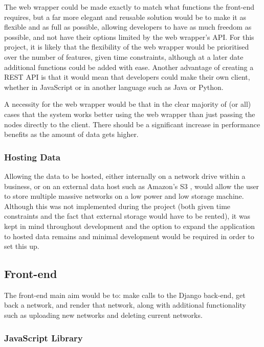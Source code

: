 \documentclass[../dissertation.tex]{subfiles}
\begin{document}
The web wrapper could be made exactly to match what functions the front-end requires, but a far more elegant and reusable solution would be to make it as flexible and as full as possible, allowing developers to have as much freedom as possible, and not have their options limited by the web wrapper's API. For this project, it is likely that the flexibility of the web wrapper would be prioritised over the number of features, given time constraints, although at a later date additional functions could be added with ease. Another advantage of creating a REST API is that it would mean that developers could make their own client, whether in JavaScript or in another language such as Java or Python.

A necessity for the web wrapper would be that in the clear majority of (or all) cases that the system works better using the web wrapper than just passing the nodes directly to the client. There should be a significant increase in performance benefits as the amount of data gets higher.

\subsubsection{Hosting Data}

Allowing the data to be hosted, either internally on a network drive within a business, or on an external data host such as Amazon's S3 \cite{amazons3}, would allow the user to store multiple massive networks on a low power and low storage machine. Although this was not implemented during the project (both given time constraints and the fact that external storage would have to be rented), it was kept in mind throughout development and the option to expand the application to hosted data remains and minimal development would be required in order to set this up.

\subsection{Front-end}

The front-end main aim would be to: make calls to the Django back-end, get back a network, and render that network, along with additional functionality such as uploading new networks and deleting current networks. 

\subsubsection{JavaScript Library}
\end{document}
